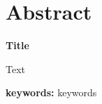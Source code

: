 \chapter*{Abstract}

\begin{center}
    {\textbf{Title}}
\end{center}


Text

\textbf{keywords:} keywords
